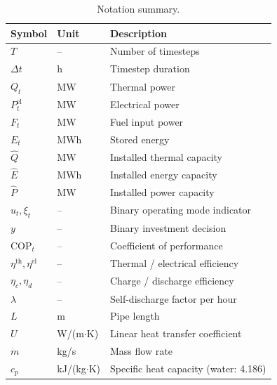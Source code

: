 \documentclass[a4paper,12pt]{article}
\newcommand{\COP}{\mathrm{COP}}
\begin{document}
\begin{table}[h!]
  \centering
  \caption{Notation summary.}
  \begin{tabular}{@{}lll@{}}
    \toprule
    Symbol & Unit & Description \\
    \midrule
    $T$                              & --             & Number of timesteps \\
    $\Delta t$                       & h              & Timestep duration \\
    $Q_t$                            & MW             & Thermal power \\
    $P^{\text{el}}_t$                & MW             & Electrical power \\
    $F_t$                            & MW             & Fuel input power \\
    $E_t$                            & MWh            & Stored energy \\
    $\hat{Q}$                        & MW             & Installed thermal capacity \\
    $\hat{E}$                        & MWh            & Installed energy capacity \\
    $\hat{P}$                        & MW             & Installed power capacity \\
    $u_t, \xi_t$                     & --             & Binary operating mode indicator \\
    $y$                              & --             & Binary investment decision \\
    $\COP_t$                         & --             & Coefficient of performance \\
    $\eta^{\text{th}}, \eta^{\text{el}}$ & --         & Thermal / electrical efficiency \\
    $\eta_c, \eta_d$                 & --             & Charge / discharge efficiency \\
    $\lambda$                        & --             & Self-discharge factor per hour \\
    $L$                              & m              & Pipe length \\
    $U$                              & W/(m$\cdot$K)  & Linear heat transfer coefficient \\
    $\dot{m}$                        & kg/s           & Mass flow rate \\
    $c_p$                            & kJ/(kg$\cdot$K)& Specific heat capacity (water: 4.186) \\

\end{tabular}
\end{table}
\end{document}
